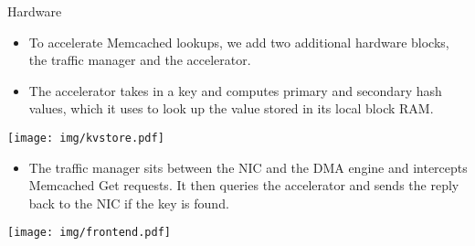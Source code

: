 \begin{block}{Hardware}

\begin{itemize}
    \item To accelerate Memcached lookups, we add two additional hardware
        blocks, the traffic manager and the accelerator.
    \item The accelerator takes in a key and computes primary and secondary
        hash values, which it uses to look up the value stored in its local
        block RAM.
\end{itemize}

\begin{center}
    \texttt{[image: img/kvstore.pdf]}
\end{center}

\begin{itemize}
    \item The traffic manager sits between the NIC and the DMA engine and
        intercepts Memcached Get requests. It then queries the accelerator
        and sends the reply back to the NIC if the key is found.
\end{itemize}

\begin{center}
    \texttt{[image: img/frontend.pdf]}
\end{center}

\end{block}
